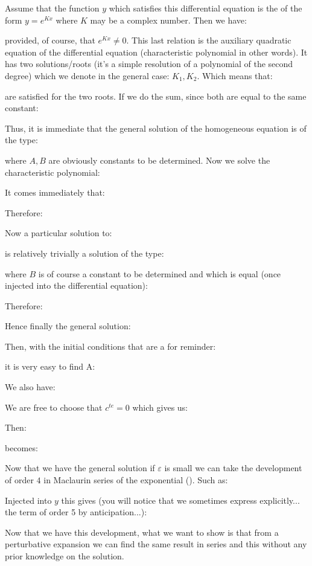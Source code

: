 	Assume that the function $y$ which satisfies this differential equation is the of the form $y=e^{Kx}$ where $K$ may be a complex number. Then we have:
	
	provided, of course, that $e^{Kx}\neq 0$. This last relation is the auxiliary quadratic equation of the differential equation (characteristic polynomial in other words). It has two solutions/roots (it's a simple resolution of a polynomial of the second degree) which we denote in the general case: $K_1,K_2$. Which means that:
	
	are satisfied for the two roots. If we do the sum, since both are equal to the same constant:
	
	Thus, it is immediate that the general solution of the homogeneous equation is of the type:
	
	where $A, B$ are obviously constants to be determined. Now we solve the characteristic polynomial:
	
	It comes immediately that:
		
	Therefore:
	
	Now a particular solution to:
	
	is relatively trivially a solution of the type:
	
	where $B$ is of course a constant to be determined and which is equal (once injected into the differential equation):
	
	Therefore:
	
	Hence finally the general solution:
	
	Then, with the initial conditions that are a for reminder:
	
	it is very easy to find A:
	
	We also have:
	
	We are free to choose that $c^{te}=0$ which gives us:
	
	Then:
	
	becomes:
	
	Now that we have the general solution if $\varepsilon$ is small we can take the development of order $4$ in Maclaurin series of the exponential (). Such as:
	
	Injected into $y$ this gives (you will notice that we sometimes express explicitly... the term of order 5 by anticipation...):
	
	Now that we have this development, what we want to show is that from a perturbative expansion we can find the same result in series and this without any prior knowledge on the solution.
	
